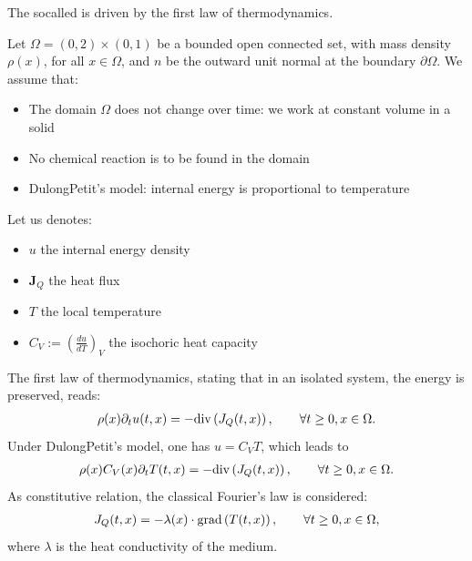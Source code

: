 \documentclass[letterpaper,10pt,english]{sphinxmanual}
\begin{document}
\sphinxAtStartPar
The so\sphinxhyphen{}called  is driven by the first law of
thermodynamics.

\sphinxAtStartPar
Let \(\Omega = (0,2) \times (0,1)\) be a bounded open connected set,
with mass density \(\rho(x)\), for all \(x \in \Omega\), and
\(n\) be the outward unit normal at the boundary
\(\partial\Omega\). We assume that:
\begin{itemize}
\item {} 
\sphinxAtStartPar
The domain \(\Omega\) does not change over time:  we work
at constant volume in a solid

\item {} 
\sphinxAtStartPar
No chemical reaction is to be found in the domain

\item {} 
\sphinxAtStartPar
Dulong\sphinxhyphen{}Petit’s model: internal energy is proportional to temperature

\end{itemize}

\sphinxAtStartPar
Let us denotes:
\begin{itemize}
\item {} 
\sphinxAtStartPar
\(u\) the internal energy density

\item {} 
\sphinxAtStartPar
\(\mathbf{J}_Q\) the heat flux

\item {} 
\sphinxAtStartPar
\(T\) the local temperature

\item {} 
\sphinxAtStartPar
\(C_V := \left( \frac{d u}{d T} \right)_V\) the isochoric heat
capacity

\end{itemize}

\sphinxAtStartPar
The first law of thermodynamics, stating that in an isolated system, the
energy is preserved, reads:
\begin{equation*}
\begin{split}\rho(x) \partial_t u(t, x) = - {\rm div} \left( J_Q(t, x) \right), \qquad \forall t \ge 0, x \in \Omega.\end{split}
\end{equation*}
\sphinxAtStartPar
Under Dulong\sphinxhyphen{}Petit’s model, one has \(u = C_V T\), which leads to
\begin{equation*}
\begin{split}\rho(x) C_V(x) \partial_t T(t, x) = - {\rm div} \left( J_Q(t, x) \right), \qquad \forall t \ge 0, x \in \Omega.\end{split}
\end{equation*}
\sphinxAtStartPar
As constitutive relation, the classical Fourier’s law is considered:
\begin{equation*}
\begin{split}J_Q(t, x) = - \lambda(x) \cdot {\rm grad} \left( T(t, x) \right), \qquad \forall t \ge 0, x \in \Omega,\end{split}
\end{equation*}
\sphinxAtStartPar
where \(\lambda\) is the  heat conductivity of the
medium.
\end{document}
